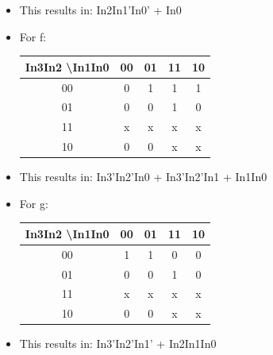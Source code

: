 \begin{itemize}
  \item This results in: In2In1'In0' + In0

  \item For f:

    \begin{center}
      \begin{tabular}[h!]{|c | c | c | c | c |}
        \hline
        In3In2 \textbackslash  In1In0 & 00 & 01 & 11 & 10\\
        \hline
        00 & 0 & 1 & 1 & 1\\
        \hline
        01 & 0 & 0 & 1 & 0\\
        \hline
        11 & x & x & x & x\\
        \hline
        10 & 0 & 0 & x & x\\
        \hline
      \end{tabular}
    \end{center}

  \item This results in: In3'In2'In0 + In3'In2'In1 + In1In0

  \item For g:

    \begin{center}
      \begin{tabular}[h!]{|c | c | c | c | c |}
        \hline
        In3In2 \textbackslash  In1In0 & 00 & 01 & 11 & 10\\
        \hline
        00 & 1 & 1 & 0 & 0\\
        \hline
        01 & 0 & 0 & 1 & 0\\
        \hline
        11 & x & x & x & x\\
        \hline
        10 & 0 & 0 & x & x\\
        \hline
      \end{tabular}
    \end{center}

  \item This results in: In3'In2'In1' + In2In1In0

\end{itemize}



